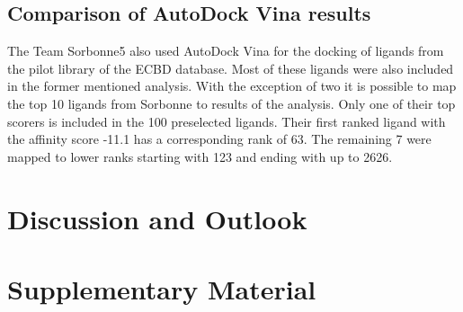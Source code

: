 \documentclass[11pt, letterpaper, titlepage]{article}
\begin{document}
\subsection{Comparison of AutoDock Vina results}
The Team Sorbonne5 also used AutoDock Vina for the docking of ligands from the pilot library of the ECBD database. Most of these ligands were also included in the former mentioned analysis. With the exception of two it is possible to map the top 10 ligands from Sorbonne to results of the analysis. Only one of their top scorers is included in the 100 preselected ligands. Their first ranked ligand with the affinity score -11.1 has a corresponding rank of 63. The remaining 7 were mapped to lower ranks starting with 123 and ending with up to 2626.

\FloatBarrier

\section{Discussion and Outlook}

\section{Supplementary Material}

\pagebreak
\FloatBarrier
\renewcommand{\bibname}{References}  %
\printbibliography
\end{document}
